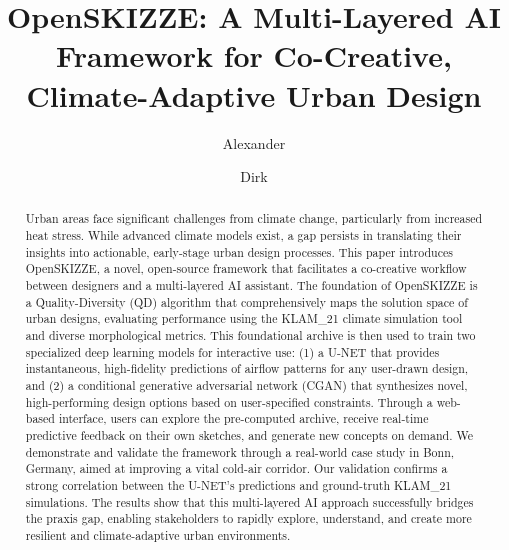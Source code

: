 \documentclass[times,final]{elsarticle}
\begin{document}
	
	
\begin{frontmatter}

\title{OpenSKIZZE: A Multi-Layered AI Framework for Co-Creative, Climate-Adaptive Urban Design}

\author[1]{Alexander }
\author[1,2]{Dirk }

\address[1]{Institute of Technology, Resource and Energy-Efficient Engineering, Bonn-Rhein-Sieg University of Applied Sciences, Sankt Augustin, Germany}
\address[2]{Fraunhofer Institute for Algorithms and Scientific Computing (SCAI), Sankt Augustin, Germany}



\begin{abstract}
Urban areas face significant challenges from climate change, particularly from increased heat stress. While advanced climate models exist, a gap persists in translating their insights into actionable, early-stage urban design processes. This paper introduces OpenSKIZZE, a novel, open-source framework that facilitates a co-creative workflow between designers and a multi-layered AI assistant. The foundation of OpenSKIZZE is a Quality-Diversity (QD) algorithm that comprehensively maps the solution space of urban designs, evaluating performance using the KLAM\_21 climate simulation tool and diverse morphological metrics. This foundational archive is then used to train two specialized deep learning models for interactive use: (1) a U-NET that provides instantaneous, high-fidelity predictions of airflow patterns for any user-drawn design, and (2) a conditional generative adversarial network (CGAN) that synthesizes novel, high-performing design options based on user-specified constraints. Through a web-based interface, users can explore the pre-computed archive, receive real-time predictive feedback on their own sketches, and generate new concepts on demand. We demonstrate and validate the framework through a real-world case study in Bonn, Germany, aimed at improving a vital cold-air corridor. Our validation confirms a strong correlation between the U-NET's predictions and ground-truth KLAM\_21 simulations. The results show that this multi-layered AI approach successfully bridges the praxis gap, enabling stakeholders to rapidly explore, understand, and create more resilient and climate-adaptive urban environments.


\end{abstract}
\end{frontmatter}
\end{document}
